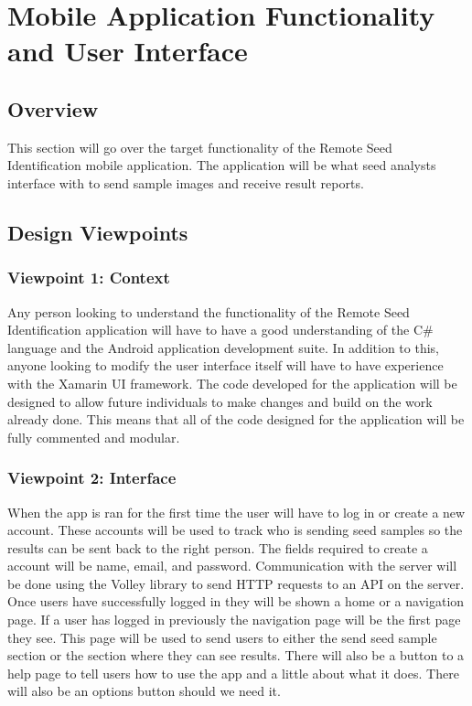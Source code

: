 \documentclass[onecolumn, draftclsnofoot,10pt, compsoc]{IEEEtran}
\begin{document}
\newpage
\section{Mobile Application Functionality and User Interface}
	\subsection{Overview}
		This section will go over the target functionality of the Remote Seed Identification mobile application. The application will be what seed analysts interface with to send sample images and receive result reports. 
	\subsection{Design Viewpoints}
    	\subsubsection{Viewpoint 1: Context}
        	Any person looking to understand the functionality of the Remote Seed Identification application will have to have a good understanding of the C\# language and the Android application development suite. In addition to this, anyone looking to modify the user interface itself will have to have experience with the Xamarin UI framework. The code developed for the application will be designed to allow future individuals to make changes and build on the work already done. This means that all of the code designed for the application will be fully commented and modular. 
        \subsubsection{Viewpoint 2: Interface}
        	When the app is ran for the first time the user will have to log in or create a new account.
		    These accounts will be used to track who is sending seed samples so the results can be sent back to the right person.
		    The fields required to create a account will be name, email, and password.
    		Communication with the server will be done using the Volley library to send HTTP requests to an API on the server.
    		Once users have successfully logged in they will be shown a home or a navigation page.
    		If a user has logged in previously the navigation page will be the first page they see.
		    This page will be used to send users to either the send seed sample section or the section where they can see results.
		    There will also be a button to a help page to tell users how to use the app and a little about what it does.
		    There will also be an options button should we need it.
            
\end{document}
